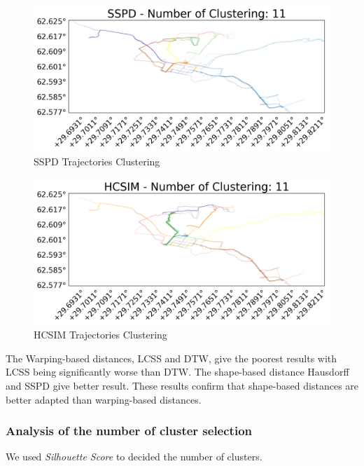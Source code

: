 \documentclass[a4paper, 12pt]{article}
\begin{document}
\pagebreak

\begin{figure}[ht]
    \centering
    \includegraphics[width=1\textwidth]{sspd_trajectory_clustering.png}
    \caption{SSPD Trajectories Clustering}
    \label{fig22}
\end{figure}

\begin{figure}[ht]
    \centering
    \includegraphics[width=1\textwidth]{hcsim_trajectory_clustering.png}
    \caption{HCSIM Trajectories Clustering}
    \label{fig23}
\end{figure}

The Warping-based distances, LCSS and DTW, give the poorest results with LCSS being significantly worse than DTW. The shape-based distance Hausdorff and SSPD give better result. These results confirm that shape-based distances are better adapted than warping-based distances.

\subsubsection{Analysis of the number of cluster selection}

We used \textit{Silhouette Score} to decided the number of clusters.
\end{document}
